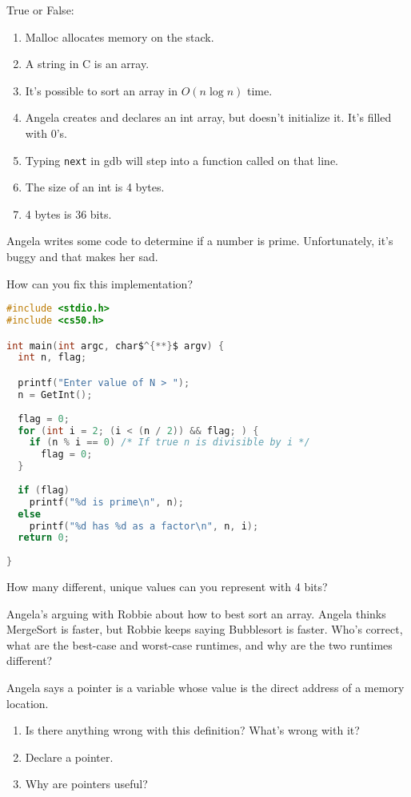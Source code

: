 \documentclass[12pt]{exam}
\begin{document}
\begin{questions}
\question
True or False:
\begin{enumerate}
\item Malloc allocates memory on the stack.
\item A string in C is an array.
\item It's possible to sort an array in $O(n \log{n})$ time.
\item Angela creates and declares an int array, but doesn't initialize it. It's filled with 0's.
\item Typing {\tt next} in gdb will step into a function called on that line.
\item The size of an int is 4 bytes.
\item 4 bytes is 36 bits.
\end{enumerate}

\newpage

\question
Angela writes some code to determine if a number is prime. Unfortunately, it's buggy and that makes her sad.

How can you fix this implementation?

\begin{lstlisting}[language=c, mathescape]
#include <stdio.h>
#include <cs50.h>

int main(int argc, char$^{**}$ argv) {
  int n, flag;

  printf("Enter value of N > ");
  n = GetInt();
  
  flag = 0;
  for (int i = 2; (i < (n / 2)) && flag; ) { 
    if (n % i == 0) /* If true n is divisible by i */
      flag = 0;
  }
 
  if (flag)
    printf("%d is prime\n", n);
  else
    printf("%d has %d as a factor\n", n, i);
  return 0;
  
}
\end{lstlisting}

\question
How many different, unique values can you represent with 4 bits?

\question 
Angela's arguing with Robbie about how to best sort an array. Angela thinks MergeSort is faster, but Robbie keeps saying Bubblesort is faster. Who's correct, what are the best-case and worst-case runtimes, and why are the two runtimes different?

\makeemptybox{2in}

\newpage

\question
Angela says a pointer is a variable whose value is the direct address of a memory location. 
\begin{enumerate}
\item Is there anything wrong with this definition? What's wrong with it?
\item Declare a pointer.
\item Why are pointers useful?
\end{enumerate}
\makeemptybox{2in}



\end{questions}
\end{document}
